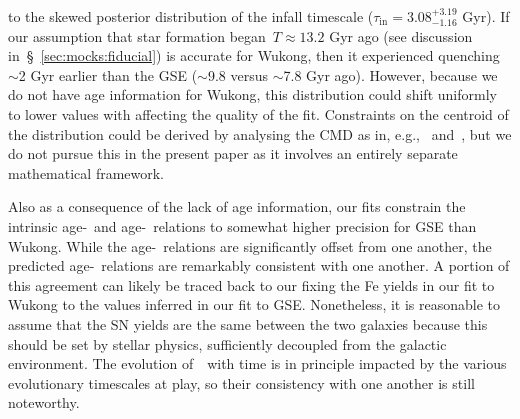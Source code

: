 \documentclass[ms.tex]{subfiles}
\begin{document}
to the skewed posterior distribution of the infall timescale
($\tau_\text{in} = 3.08^{+3.19}_{-1.16}$ Gyr).
If our assumption that star formation began~$T \approx 13.2$ Gyr ago (see
discussion in~\S~\ref{sec:mocks:fiducial}) is accurate for Wukong, then it
experienced quenching~$\sim$2 Gyr earlier than the GSE ($\sim$9.8 versus
$\sim$7.8 Gyr ago).
However, because we do not have age information for Wukong, this distribution
could shift uniformly to lower values with affecting the quality of the fit.
Constraints on the centroid of the distribution could be derived by
analysing the CMD as in, e.g.,~\citet{Dolphin2002} and~\citet{Weisz2014b}, but
we do not pursue this in the present paper as it involves an entirely separate
mathematical framework.
\par
Also as a consequence of the lack of age information, our fits constrain the
intrinsic age-\feh~and age-\afe~relations to somewhat higher precision for GSE
than Wukong.
While the age-\feh~relations are significantly offset from one another, the
predicted age-\afe~relations are remarkably consistent with one another.
A portion of this agreement can likely be traced back to our fixing the Fe
yields in our fit to Wukong to the values inferred in our fit to GSE.
Nonetheless, it is reasonable to assume that the SN yields are the same between
the two galaxies because this should be set by stellar physics, sufficiently
decoupled from the galactic environment.
The evolution of~\afe~with time is in principle impacted by the various
evolutionary timescales at play, so their consistency with one another is still
noteworthy.
\end{document}
